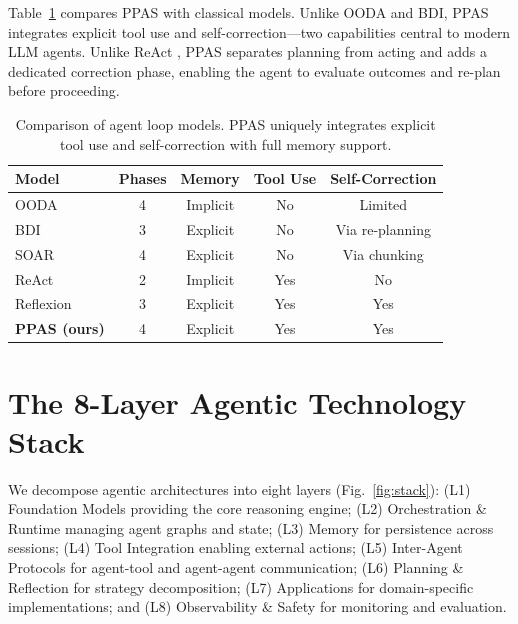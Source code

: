 \documentclass[sn-basic]{sn-jnl}
\theoremstyle{definition}
\begin{document}
Table~\ref{tab:loop-comparison} compares PPAS with classical models. Unlike OODA and BDI, PPAS integrates explicit tool use and self-correction---two capabilities central to modern LLM agents. Unlike ReAct \citep{yao2023react}, PPAS separates planning from acting and adds a dedicated correction phase, enabling the agent to evaluate outcomes and re-plan before proceeding.

\begin{table}[ht]
\centering
\caption{Comparison of agent loop models. PPAS uniquely integrates explicit tool use and self-correction with full memory support.}
\label{tab:loop-comparison}
\begin{tabular}{lcccc}
\toprule
\textbf{Model} & \textbf{Phases} & \textbf{Memory} & \textbf{Tool Use} & \textbf{Self-Correction} \\
\midrule
OODA \citep{boyd1987ooda}           & 4 & Implicit  & No  & Limited \\
BDI \citep{rao1995bdi}              & 3 & Explicit  & No  & Via re-planning \\
SOAR \citep{laird2012soar}          & 4 & Explicit  & No  & Via chunking \\
ReAct \citep{yao2023react}          & 2 & Implicit  & Yes & No \\
Reflexion \citep{shinn2023reflexion} & 3 & Explicit & Yes & Yes \\
\textbf{PPAS (ours)}                 & 4 & Explicit  & Yes & Yes \\
\bottomrule
\end{tabular}
\end{table}

\section{The 8-Layer Agentic Technology Stack}\label{sec:stack}

We decompose agentic architectures into eight layers (Fig.~\ref{fig:stack}): (L1) Foundation Models providing the core reasoning engine; (L2) Orchestration \& Runtime managing agent graphs and state; (L3) Memory for persistence across sessions; (L4) Tool Integration enabling external actions; (L5) Inter-Agent Protocols for agent-tool and agent-agent communication; (L6) Planning \& Reflection for strategy decomposition; (L7) Applications for domain-specific implementations; and (L8) Observability \& Safety for monitoring and evaluation.
\end{document}
